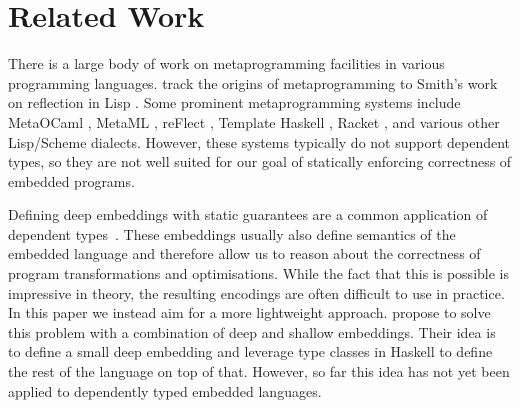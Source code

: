 \documentclass[sigplan,screen]{acmart}
\begin{document}





\section{\label{sec:related}Related Work}

There is a large body of
work on metaprogramming facilities in various programming
languages.  \citet{refl-masses} track the origins
of metaprogramming to Smith's work on reflection in Lisp \cite{refl-lisp}.
Some prominent metaprogramming systems include
MetaOCaml \cite{metaocaml}, Me\-taML \cite{metaml},
reFlect \cite{DBLP:journals/jfp/GrundyMO06},
Template Haskell \cite{sheard2002template},
Racket \cite{plt-tr1}, and various other Lisp/Scheme dialects.
%
However, these systems typically do not support dependent
types, so they are not well suited for our goal of statically
enforcing correctness of embedded programs.

Defining deep embeddings with static guarantees are a common application
of dependent types~\cite{10.5555/647849.737066,CHAPMAN200921,
10.1007/978-3-540-74464-1_7,10.1145/3236785,10.1145/1863495.1863497}.
%
These embeddings usually also define semantics of the embedded
language and therefore allow us to reason about the correctness
of program transformations and optimisations.
%
While the fact that this is possible is impressive in theory, the resulting
encodings are often difficult to use in practice. In this paper
we instead aim for a more lightweight approach.
%
\citet{deepshallow} propose to solve this problem with
a combination of deep and shallow embeddings.  Their idea is to define
a small deep embedding and leverage type classes in Haskell to define
the rest of the language on top of that.  However, so far this idea has not yet
been applied to dependently typed embedded languages.
\end{document}
